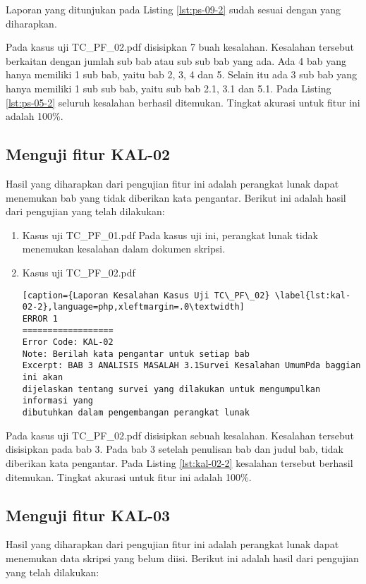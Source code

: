 Laporan yang ditunjukan pada Listing \ref{lst:ps-09-2} sudah sesuai dengan yang diharapkan.

Pada kasus uji TC\_PF\_02.pdf disisipkan 7 buah kesalahan. Kesalahan tersebut berkaitan dengan jumlah sub bab atau sub sub bab yang ada. Ada 4 bab yang hanya memiliki 1 sub bab, yaitu bab 2, 3, 4 dan 5. Selain itu ada 3 sub bab yang hanya memiliki 1 sub sub bab, yaitu sub bab 2.1, 3.1 dan 5.1. Pada Listing \ref{lst:ps-05-2} seluruh kesalahan berhasil ditemukan. Tingkat akurasi untuk fitur ini adalah 100\%.

\subsection{Menguji fitur KAL-02}
Hasil yang diharapkan dari pengujian fitur ini adalah perangkat lunak dapat menemukan bab yang tidak diberikan kata pengantar. Berikut ini adalah hasil dari pengujian yang telah dilakukan:

\begin{enumerate}
	\item Kasus uji TC\_PF\_01.pdf \newline
	Pada kasus uji ini, perangkat lunak tidak menemukan kesalahan dalam dokumen skripsi.
	
	\item Kasus uji TC\_PF\_02.pdf
	
\begin{lstlisting}[caption={Laporan Kesalahan Kasus Uji TC\_PF\_02}	\label{lst:kal-02-2},language=php,xleftmargin=.0\textwidth]
ERROR 1
==================
Error Code: KAL-02
Note: Berilah kata pengantar untuk setiap bab
Excerpt: BAB 3 ANALISIS MASALAH 3.1Survei Kesalahan UmumPda baggian ini akan 
dijelaskan tentang survei yang dilakukan untuk mengumpulkan informasi yang 
dibutuhkan dalam pengembangan perangkat lunak
\end{lstlisting}
\end{enumerate}

Pada kasus uji TC\_PF\_02.pdf disisipkan sebuah kesalahan. Kesalahan tersebut disisipkan pada bab 3. Pada bab 3 setelah penulisan bab dan judul bab, tidak diberikan kata pengantar. Pada Listing \ref{lst:kal-02-2} kesalahan tersebut berhasil ditemukan. Tingkat akurasi untuk fitur ini adalah 100\%.

\subsection{Menguji fitur KAL-03}
Hasil yang diharapkan dari pengujian fitur ini adalah perangkat lunak dapat menemukan data skripsi yang belum diisi. Berikut ini adalah hasil dari pengujian yang telah dilakukan:

